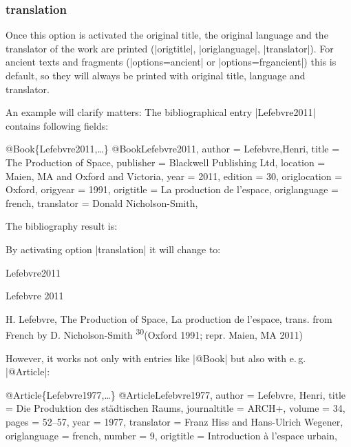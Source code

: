 \documentclass[a4paper,
10pt,
greek,
french,
spanish,
italian,
ngerman,
english
]{ltxdoc}
\begin{document}

\subsubsection{translation}\label{translation}
Once this option is activated the original title, the original language and the translator of the work are printed (|origtitle|, |origlanguage|, |translator|).
For ancient texts and fragments (|options={ancient}| or |options={frgancient}|) this is default, 
so they will always be printed with original title, language and translator.

An example will clarify matters:
The bibliographical entry |Lefebvre2011| contains following fields:
\begin{bibexample}[label=Lefebvre2011]{{@}Book\{Lefebvre2011,…\}}
@Book{Lefebvre2011,
  author       = {Lefebvre,Henri},
  title        = {The Production of Space},
  publisher    = {Blackwell Publishing Ltd},
  location     = {Maien, MA and Oxford and Victoria},
  year         = {2011},
  edition      = {30},
  origlocation = {Oxford},
  origyear     = {1991},
  origtitle    = {La production de l’espace},
  origlanguage = {french},
  translator   = {Donald Nicholson-Smith},
}
\end{bibexample}

The bibliography result is:

By activating option |translation| it will change to:

\begin{bibbox}{Lefebvre2011}\footnotesize
\parbox[t]{2cm}{Lefebvre 2011} \parbox[t]{9cm}{H. Lefebvre,  The Production of Space, 
{\color{red} La production de l’espace, trans. from French by D. Nicholson-Smith} \textsuperscript{30}(Oxford 1991; repr. Maien, MA 2011)}
\end{bibbox}
 
However, it works not only with entries like |@Book| but also with e.\,g. |@Article|:

\begin{bibexample}[label=Lefebvre1977]{{@}Article\{Lefebvre1977,…\}}
@Article{Lefebvre1977,
  author       = {Lefebvre, Henri},
  title        = {Die Produktion des städtischen Raums},
  journaltitle = {ARCH+},
  volume       = {34},
  pages        = {52--57},
  year         = {1977},
  translator   = {Franz Hiss and Hans-Ulrich Wegener},
  origlanguage = {french},
  number       = {9},
  origtitle    = {Introduction à l'espace urbain},
}
\end{bibexample}
\end{document}
